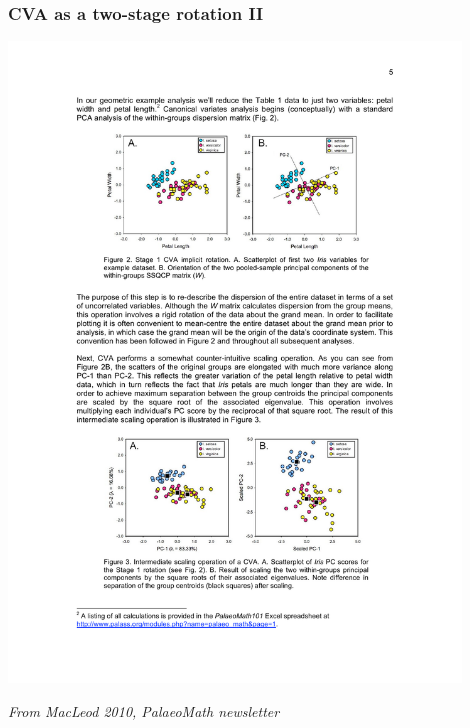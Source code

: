 \documentclass{beamer}
\begin{document}
\begin{frame}
  \frametitle{CVA as a two-stage rotation II}

\begin{center}
\includegraphics[width=0.9\textwidth]{cva-as-rot2}
\end{center}

\hfill {\scriptsize \textit{From MacLeod 2010, PalaeoMath newsletter}}


\end{frame}
\end{document}
